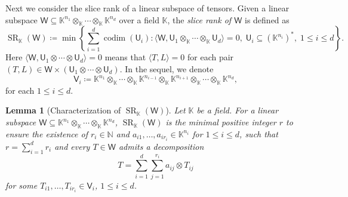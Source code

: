 \documentclass[10pt]{article}
\newtheorem{lemma}[theorem]{Lemma}
\theoremstyle{definition}
\DeclareMathOperator{\sr}{SR}
\DeclareMathOperator{\codim}{codim}
\begin{document}
Next we consider the slice rank of a linear subspace of tensors.  Given a linear subspace $\mathsf{W} \subseteq \mathbb{K}^{n_1} \otimes_{\mathbb{K}}  \cdots \otimes_{\mathbb{K}}   \mathbb{K}^{n_d}$ over a field $\mathbb{K}$,  the \emph{slice rank of $\mathsf{W}$} is defined as 
\begin{equation}\label{eq:SRW}
\sr_{\mathbb{K}}(\mathsf{W}) \coloneqq \min \left\lbrace \sum_{i=1}^{d} \codim( \mathsf{U}_{i}):  \langle \mathsf{W}, \mathsf{U}_{1} \otimes_{\mathbb{K}}  \cdots \otimes_{\mathbb{K}}  \mathsf{U}_{d}\rangle=0,\; \mathsf{U}_i \subseteq (\mathbb{K}^{n_i})^{\ast},\;1 \le i  \le d \right\rbrace.
\end{equation}
Here $\langle \mathsf{W}, \mathsf{U}_{1}\otimes \cdots\otimes  \mathsf{U}_{d}\rangle = 0$ means that $\langle T,  L \rangle = 0$ for each pair $(T, L) \in \mathsf{W} \times \left( \mathsf{U}_{1}\otimes \cdots\otimes \mathsf{U}_{d} \right)$.  In the sequel,  we denote 
\begin{equation}\label{eq:Vi}
\mathsf{V}_i \coloneqq \mathbb{K}^{n_1} \otimes_{\mathbb{K}}  \cdots \otimes_{\mathbb{K}}  \mathbb{K}^{n_{i-1}} \otimes_{\mathbb{K}}  \mathbb{K}^{n_{i+1}} \otimes_{\mathbb{K}}  \cdots \otimes_{\mathbb{K}}  \mathbb{K}^{n_d},
\end{equation}
for each $1 \le i \le d$.
\begin{lemma}[Characterization of $\sr_{\mathbb{K}}(\mathsf{W})$]\label{lem4-8}
Let $\mathbb{K}$ be a field.  For a linear subspace $\mathsf{W} \subseteq \mathbb{K}^{n_1} \otimes_{\mathbb{K}}  \cdots \otimes_{\mathbb{K}}  \mathbb{K}^{n_d}$,  $\sr_{\mathbb{K}}(\mathsf{W})$ is the minimal positive integer $r$ to ensure the existence of $r_i \in \mathbb{N}$ and $a_{i1},\dots,  a_{ir_i} \in \mathbb{K}^{n_i}$ for $1 \le i \le d$,  such that $r = \sum_{i=1}^d r_i$ and every $T \in \mathsf{W}$ admits a decomposition
\begin{equation}\label{lem4-8:eq1}
T = \sum_{i=1}^d  \sum_{j=1}^{r_i} a_{ij} \otimes T_{ij}
\end{equation}
for some $T_{i1},\dots,  T_{ir_i} \in \mathsf{V}_i$,  $1 \le i \le d$.  
\end{lemma}
\end{document}
